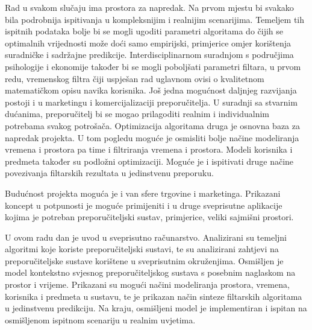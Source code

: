 \documentclass[times, utf8, diplomski, numeric]{fer}
\begin{document}
Rad u svakom slučaju ima prostora za napredak. Na prvom mjestu bi svakako bila
podrobnija ispitivanja u kompleksnijim i realnijim scenarijima. Temeljem tih
ispitnih podataka bolje bi se mogli ugoditi parametri algoritama do čijih se
optimalnih vrijednosti može doći samo empirijski, primjerice omjer korištenja
suradničke i sadržajne predikcije. Interdisciplinarnom suradnjom s područjima
psihologije i ekonomije također bi se mogli poboljšati parametri filtara, u
prvom redu, vremenskog filtra čiji uspješan rad uglavnom ovisi o kvalitetnom
matematičkom opisu navika korisnika. Još jedna mogućnost daljnjeg razvijanja
postoji i u marketingu i komercijalizaciji preporučitelja. U suradnji sa
stvarnim dućanima, preporučitelj bi se mogao prilagoditi realnim i individualnim
potrebama svakog potrošača. Optimizacija algoritama druga je osnovna baza za
napredak projekta. U tom pogledu moguće je osmisliti bolje načine modeliranja
vremena i prostora pa time i filtriranja vremena i prostora. Modeli korisnika i
predmeta također su podložni optimizaciji. Moguće je i ispitivati druge načine
povezivanja filtarskih rezultata u jedinstvenu preporuku.

Budućnost projekta moguća je i van sfere trgovine i marketinga. Prikazani
koncept u potpunosti je moguće primijeniti i u druge sveprisutne aplikacije
kojima je potreban preporučiteljski sustav, primjerice, veliki sajmišni
prostori.




\begin{sazetak}
U ovom radu dan je uvod u sveprisutno računarstvo. Analizirani su temeljni
algoritmi koje koriste preporučiteljski sustavi, te su analizirani zahtjevi na
preporučiteljske sustave korištene u sveprisutnim okruženjima. Osmišljen je
model kontekstno svjesnog preporučiteljskog sustava s posebnim naglaskom na
prostor i vrijeme. Prikazani su mogući načini modeliranja prostora, vremena,
korisnika i predmeta u sustavu, te je prikazan način sinteze filtarskih
algoritama u jedinstvenu predikciju. Na kraju, osmišljeni model je
implementiran i ispitan na osmišljenom ispitnom scenariju u realnim uvjetima.

\end{sazetak}
\end{document}
